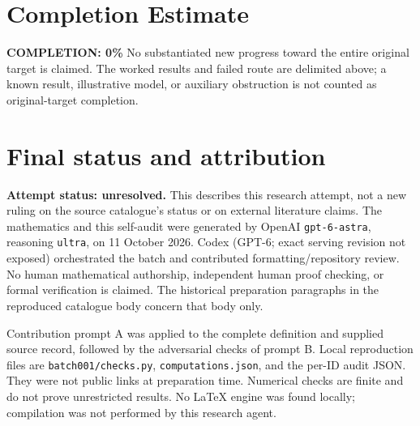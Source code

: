 \documentclass[11pt]{article}
\begin{document}
\section{Completion Estimate}
\noindent\textbf{COMPLETION: 0\%}
No substantiated new progress toward the entire original target is claimed. The worked results and failed route are delimited above; a known result, illustrative model, or auxiliary obstruction is not counted as original-target completion.

\section{Final status and attribution}
\textbf{Attempt status: unresolved.} This describes this research attempt, not a new ruling on the source catalogue's status or on external literature claims.
The mathematics and this self-audit were generated by OpenAI \texttt{gpt-6-astra}, reasoning \texttt{ultra}, on 11 October 2026. Codex (GPT-6; exact serving revision not exposed) orchestrated the batch and contributed formatting/repository review. No human mathematical authorship, independent human proof checking, or formal verification is claimed. The historical preparation paragraphs in the reproduced catalogue body concern that body only.

Contribution prompt A was applied to the complete definition and supplied source record, followed by the adversarial checks of prompt B. Local reproduction files are \texttt{batch001/checks.py}, \texttt{computations.json}, and the per-ID audit JSON. They were not public links at preparation time. Numerical checks are finite and do not prove unrestricted results. No LaTeX engine was found locally; compilation was not performed by this research agent.
\end{document}
